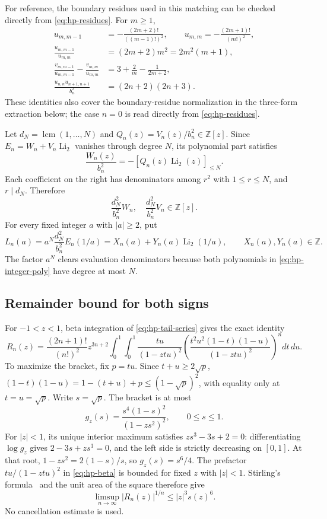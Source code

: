 For reference, the boundary residues used in this matching can be checked
directly from \eqref{eq:hp-residues}.  For $m\ge1$,
\begin{align}
 u_{m,m-1}&=-\frac{(2m+2)!}{((m-1)!)^2},\qquad
 u_{m,m}=-\frac{(2m+1)!}{(m!)^2},\\
 \frac{u_{m,m-1}}{u_{m,m}}&=(2m+2)m^2=2m^2(m+1),\\
 \frac{v_{m,m-1}}{u_{m,m-1}}-\frac{v_{m,m}}{u_{m,m}}
   &=3+\frac2m-\frac1{2m+2},\\
 \frac{u_{n,n}u_{n+1,n+1}}{b_n^2}&=(2n+2)(2n+3).
\end{align}
These identities also cover the boundary-residue normalization in the
three-form extraction below; the case $n=0$ is read directly from
\eqref{eq:hp-residues}.

Let $d_N=\operatorname{lcm}(1,\ldots,N)$ and
$Q_n(z)=V_n(z)/b_n^2\in\mathbb Z[z]$.  Since $E_n=W_n+V_n\operatorname{Li}_2$
vanishes through degree $N$, its polynomial part satisfies
\[
 \frac{W_n(z)}{b_n^2}=-[Q_n(z)\operatorname{Li}_2(z)]_{\le N}.
\]
Each coefficient on the right has denominators among $r^2$ with
$1\le r\le N$, and $r\mid d_N$.  Therefore
\begin{equation}\label{eq:hp-integer-poly}
 \frac{d_N^2}{b_n^2}W_n,\quad
 \frac{d_N^2}{b_n^2}V_n\in\mathbb Z[z].
\end{equation}
For every fixed integer $a$ with $|a|\ge2$, put
\begin{equation}\label{eq:hp-integer-form}
 L_n(a)=a^N\frac{d_N^2}{b_n^2}E_n(1/a)
       =X_n(a)+Y_n(a)\operatorname{Li}_2(1/a),
       \qquad X_n(a),Y_n(a)\in\mathbb Z.
\end{equation}
The factor $a^N$ clears evaluation denominators because both polynomials in
\eqref{eq:hp-integer-poly} have degree at most $N$.

\subsection{Remainder bound for both signs}
For $-1<z<1$, beta integration of \eqref{eq:hp-tail-series} gives the exact
identity
\begin{equation}\label{eq:hp-beta}
 R_n(z)=\frac{(2n+1)!}{(n!)^2}z^{3n+2}
 \int_0^1\!\int_0^1\frac{tu}{(1-ztu)^2}
 \left(\frac{t^2u^2(1-t)(1-u)}{(1-ztu)^2}\right)^n dt\,du.
\end{equation}
To maximize the bracket, fix $p=tu$.  Since $t+u\ge2\sqrt p$,
$(1-t)(1-u)=1-(t+u)+p\le(1-\sqrt p)^2$, with equality only at
$t=u=\sqrt p$.  Write $s=\sqrt p$.  The bracket is at most
\[
 g_z(s)=\frac{s^4(1-s)^2}{(1-zs^2)^2},\qquad 0\le s\le1.
\]
For $|z|<1$, its unique interior maximum satisfies
$zs^3-3s+2=0$: differentiating $\log g_z$ gives
$2-3s+zs^3=0$, and the left side is strictly decreasing on $[0,1]$.
At that root, $1-zs^2=2(1-s)/s$, so $g_z(s)=s^6/4$.  The prefactor
$tu/(1-ztu)^2$ in \eqref{eq:hp-beta} is bounded for fixed $z$ with
$|z|<1$.  Stirling's formula~\cite{WhittakerWatson} and the unit area of the square therefore give
\begin{equation}\label{eq:hp-R-rate}
 \limsup_{n\to\infty}|R_n(z)|^{1/n}\le |z|^3s(z)^6.
\end{equation}
No cancellation estimate is used.

